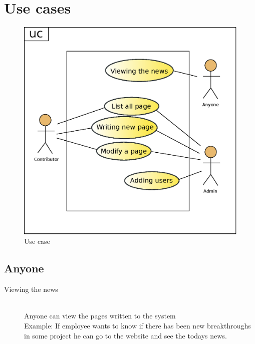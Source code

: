 \documentclass[12pt,a4paper,oneside,draft]{book}
\begin{document}
\section{Use cases}
\begin{figure}
\centering
\includegraphics[width=\textwidth]{use_cases.eps}
\caption{Use case}
\end{figure}

\subsection{Anyone}
\begin{description}
  \item[Viewing the news] \hfill \\
	Anyone can view the pages written to the system \hfill \\
	Example: If employee wants to know if there has been new breakthroughs in some project he can go to the website and see the todays news.
\end{description}
\end{document}
